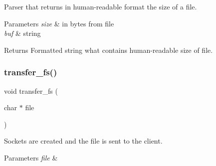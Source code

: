 Parser that returns in human-\/readable format the size of a file. 


\begin{DoxyParams}{Parameters}
{\em size} & in bytes from file \\
\hline
{\em buf} & string \\
\hline
\end{DoxyParams}
\begin{DoxyReturn}{Returns}
Formatted string what contains human-\/readable size of file. 
\end{DoxyReturn}
\mbox{\label{fileserv_8c_a5ea0687811fad6f1c67348a52ec2bb7a}} 
\subsubsection{transfer\+\_\+fs()}
{\footnotesize\ttfamily void transfer\+\_\+fs (\begin{DoxyParamCaption}\item[{char $\ast$}]{file }\end{DoxyParamCaption})}



Sockets are created and the file is sent to the client. 


\begin{DoxyParams}{Parameters}
{\em file} & \\
\hline
\end{DoxyParams}
